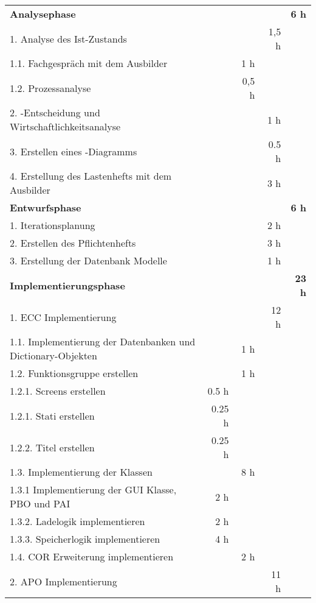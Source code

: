 \begin{tabu}{lrrrr}
\rowfont{\bfseries\leavevmode\color{headingfont}}\textbf{Analysephase} & \textbf{} & \textbf{} & \textbf{} & \textbf{6 h} \\
1. Analyse des Ist-Zustands & & & 1,5 h & \\
1.1. Fachgespräch mit dem Ausbilder & & 1 h & & \\
1.2. Prozessanalyse & & 0,5 h & & \\
2. -Entscheidung und Wirtschaftlichkeitsanalyse & &       & 1 h   &  \\
3. Erstellen eines -Diagramms & & & 0.5 h & \\
4. Erstellung des Lastenhefts mit dem Ausbilder & & & 3 h & \\
\rowfont{\color{headingfont}}\textbf{Entwurfsphase} & \textbf{} & \textbf{} & \textbf{} & \textbf{6 h} \\
1. Iterationsplanung & & & 2 h & \\
2. Erstellen des Pflichtenhefts & & & 3 h & \\
3. Erstellung der Datenbank Modelle & & & 1 h & \\
\rowfont{\color{headingfont}}\textbf{Implementierungsphase} & \textbf{} & \textbf{} & \textbf{} & \textbf{23 h} \\
1. ECC Implementierung & & & 12 h & \\
1.1. Implementierung der Datenbanken und Dictionary-Objekten & & 1 h & & \\
1.2. Funktionsgruppe erstellen & & 1 h & \\
1.2.1. Screens erstellen & 0.5 h & & & \\
1.2.1. Stati erstellen & 0.25 h & & & \\
1.2.2. Titel erstellen & 0.25 h & & & \\
1.3. Implementierung der Klassen & & 8 h & & \\
1.3.1 Implementierung der GUI Klasse, PBO und PAI & 2 h & & & \\
1.3.2. Ladelogik implementieren & 2 h & & & \\
1.3.3. Speicherlogik implementieren & 4 h & & & \\
1.4. COR Erweiterung implementieren & & 2 h & & \\
2. APO Implementierung & & & 11 h & \\

\end{tabu}
